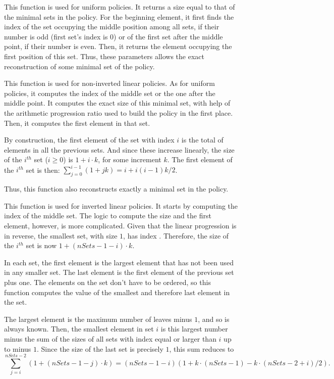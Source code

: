 \documentclass{article}
\begin{document}
\begin{description}
\item[] This function is used for uniform policies. It returns a size equal to that of the minimal sets in the policy. For the beginning element, it first finds the index of the set occupying the middle position among all sets, if their number is odd (first set's index is $0$) or of the first set after the middle point, if their number is even. Then, it returns the element occupying the first position of this set.
Thus, these parameters allows the exact reconstruction of some minimal set of the policy.

\item[] This function is used for non-inverted linear policies. As for uniform policies, it computes the index of the middle set or the one after the middle point. It computes the exact size of this minimal set, with help of the arithmetic progression ratio used to build the policy in the first place. Then, it computes the first element in that set. 

By construction, the first element of the set with index $i$ is the total of elements in all the previous sets. And since these increase linearly, the size of the $i^{th}$ set ($ i \geq 0$) is $1 + i \cdot k$, for some increment $k$. The first element of the $i^{th}$ set is then: $\sum_{j=0}^{i-1} (1 + jk) = i + i(i-1) k /2$.

Thus, this function also reconstructs exactly a minimal set in the policy.

\item[] This function is used for inverted linear policies. It starts by computing the index of the middle set.  The logic to compute the size and the first element, however, is more complicated. Given that the linear progression is in reverse, the smallest set, with size $1$, has index . Therefore, the size of the $i^{th}$ set is now $1 + (nSets - 1 - i) \cdot k$.

In each set, the first element is the largest element that has not been used in any smaller set. The last element is the first element of the previous set plus one. The elements on the set don't have to be ordered, so this function computes the value of the smallest and therefore last element in the set.

The largest element is the maximum number of leaves minus $1$, and so is always known. Then, the smallest element in set $i$ is this largest number minus the sum of the sizes of all sets with index equal or larger than $i$ up to  minus $1$. Since the size of the last set is precisely $1$, this sum reduces to $$\sum_{j=i}^{nSets - 2} (1 + (nSets - 1 - j) \cdot k) = (nSets - 1 - i) \left(1 + k \cdot \left(nSets - 1\right) - k \cdot \left( nSets - 2 + i\right)/2 \right).$$


\end{description}
\end{document}
